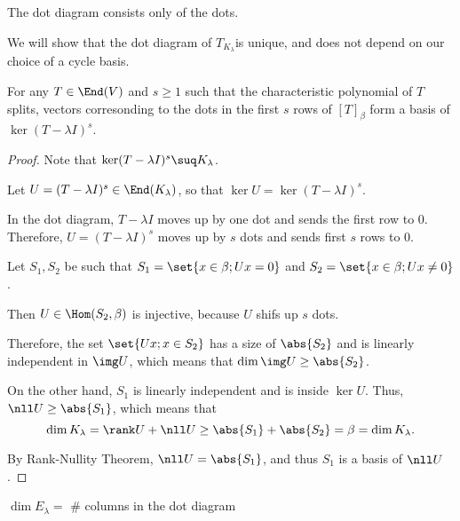 \documentclass[11pt]{scrartcl}
\begin{document}
The dot diagram consists only of the dots.

We will show that the dot diagram of $T_{K_{\lambda}}$is unique, and does not depend on our choice of a cycle basis.




\begin{theorem}

  \label{thm-9}
  For any $T \in \End(V)$ and $s\geq 1$ such that the characteristic
  polynomial of $T$ splits, vectors corresonding to the dots in the
  first $s$ rows of $[T]_{\beta}$ form a basis of
  $\ker (T-\lambda I)^s$.
\end{theorem}

\begin{proof}
  \hfill

  Note that $\ker (T-\lambda I)^s \suq K_{\lambda}$.

  Let $U = (T-\lambda I)^s \in \End(K_{\lambda})$, so that $\ker U = \ker (T-\lambda I)^s$.

  In the dot diagram, $T-\lambda I$ moves up by one dot and sends the
  first row to $0$. Therefore, $U = (T-\lambda I)^s$ moves up by $s$ dots and sends first $s$ rows to $0$.

  Let $S_1, S_2$ be such that $S_1 = \set{x\in \beta; Ux = 0}$ and $S_2 = \set{x\in \beta; Ux \neq 0}$.

  Then $U \in \Hom(S_2, \beta)$ is injective, because $U$ shifs up $s$ dots.

  Therefore, the set $\set{Ux; x\in S_2}$ has a size of $\abs{S_2}$
  and is linearly independent in $\img U$, which means that
  $\dim \img U \geq \abs{S_2} $.

  On the other hand, $S_1$ is linearly independent and is inside $\ker U$. Thus, $\nll U \geq \abs{S_1}$, which means that \[\dim K_{\lambda} = \rank U + \nll U \geq \abs{S_1}+\abs{S_2} = \beta = \dim K_{\lambda}.\]

  By Rank-Nullity Theorem, $\nll U = \abs{S_1}$, and thus $S_1$ is a basis of $\nll U$.
\end{proof}

\begin{corollary}
  $\dim E_{\lambda} = $ \# columns in the dot diagram
\end{corollary}
\end{document}
